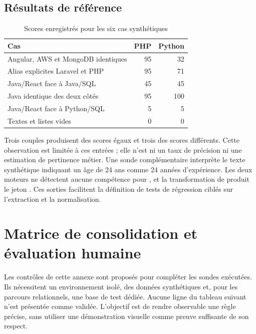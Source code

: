 \section{Résultats de référence}

\begin{table}[htbp]
\centering
\small
\caption{Scores enregistrés pour les six cas synthétiques}
\label{tab:ann-six-cas}
\begin{tabularx}{\textwidth}{@{}Xrr@{}}
\toprule
Cas & PHP & Python \\
\midrule
Angular, AWS et MongoDB identiques & 95 & 32 \\
Alias explicites Laravel et PHP & 95 & 71 \\
Java/React face à Java/SQL & 45 & 45 \\
Java identique des deux côtés & 95 & 100 \\
Java/React face à Python/SQL & 5 & 5 \\
Textes et listes vides & 0 & 0 \\
\bottomrule
\end{tabularx}
\end{table}

Trois couples produisent des scores égaux et trois des scores différents. Cette observation est limitée à ces entrées ; elle n'est ni un taux de précision ni une estimation de pertinence métier. Une sonde complémentaire interprète le texte synthétique indiquant un âge de 24 ans comme 24 années d'expérience. Les deux moteurs ne détectent aucune compétence pour , et la transformation de  produit le jeton . Ces sorties facilitent la définition de tests de régression ciblés sur l'extraction et la normalisation.

\chapter{Matrice de consolidation et évaluation humaine}
\label{ann:evaluation}

Les contrôles de cette annexe sont proposés pour compléter les sondes exécutées. Ils nécessitent un environnement isolé, des données synthétiques et, pour les parcours relationnels, une base de test dédiée. Aucune ligne du tableau suivant n'est présentée comme validée. L'objectif est de rendre observable une règle précise, sans utiliser une démonstration visuelle comme preuve suffisante de son respect.

